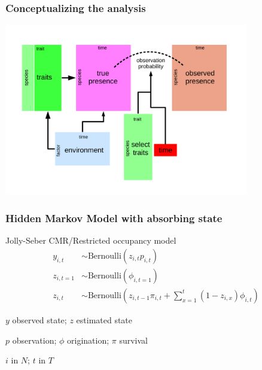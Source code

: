 \documentclass[aspectratio=169]{beamer}
\begin{document}
\begin{frame}
  \frametitle{Conceptualizing the analysis}
  \begin{center}
    \includegraphics[width=0.8\textwidth,height=\textheight,keepaspectratio=true]{figure/paleo_fourth_corner}
  \end{center}
\end{frame}

\begin{frame}
  \frametitle{Hidden Markov Model with absorbing state}
  \begin{block}{Jolly-Seber CMR/Restricted occupancy model}
    \setlength\abovedisplayskip{-0.3cm}
    \begin{align*}
      y_{i, t} &\sim \text{Bernoulli}(z_{i, t} p_{i, t}) \\
      z_{i, t = 1} &\sim \text{Bernoulli}(\phi_{i, t = 1}) \\
      z_{i, t} &\sim \text{Bernoulli}\left(z_{i, t - 1} \pi_{i,t} + \sum_{x = 1}^{t}(1 - z_{i, x}) \phi_{i, t}\right)
    \end{align*}
    \begin{scriptsize}
      \(y\) observed state; \(z\) estimated state

      \(p\) observation; \(\phi\) origination; \(\pi\) survival

      \(i\) in \(N\); \(t\) in \(T\)
    \end{scriptsize}
  \end{block}
\end{frame}
\end{document}
